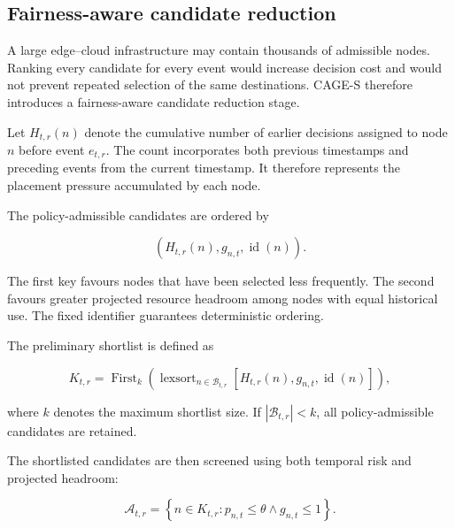 \subsection{Fairness-aware candidate reduction}

A large edge--cloud infrastructure may contain thousands of admissible
nodes. Ranking every candidate for every event would increase decision
cost and would not prevent repeated selection of the same destinations.
CAGE-S therefore introduces a fairness-aware candidate reduction stage.

Let $H_{t,r}(n)$ denote the cumulative number of earlier decisions
assigned to node $n$ before event $e_{t,r}$. The count incorporates both
previous timestamps and preceding events from the current timestamp. It
therefore represents the placement pressure accumulated by each node.

The policy-admissible candidates are ordered by

\begin{equation}
\label{eq:fair-preorder}
    \left(
        H_{t,r}(n),
        g_{n,t},
        \operatorname{id}(n)
    \right).
\end{equation}

The first key favours nodes that have been selected less frequently. The
second favours greater projected resource headroom among nodes with equal
historical use. The fixed identifier guarantees deterministic ordering.

The preliminary shortlist is defined as

\begin{equation}
\label{eq:method-shortlist}
    K_{t,r}
    =
    \operatorname{First}_{k}
    \left(
        \operatorname{lexsort}_{n\in\mathcal{B}_{t,r}}
        \left[
            H_{t,r}(n),
            g_{n,t},
            \operatorname{id}(n)
        \right]
    \right),
\end{equation}

where $k$ denotes the maximum shortlist size. If
$|\mathcal{B}_{t,r}|<k$, all policy-admissible candidates are retained.

The shortlisted candidates are then screened using both temporal risk and
projected headroom:

\begin{equation}
\label{eq:accepted-shortlist-method}
    \mathcal{A}_{t,r}
    =
    \left\{
        n\in K_{t,r}:
        p_{n,t}\leq\theta
        \land
        g_{n,t}\leq1
    \right\}.
\end{equation}

